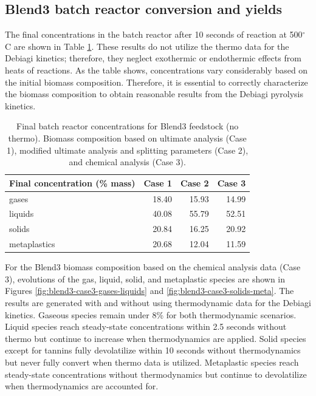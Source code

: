 \subsection{Blend3 batch reactor conversion and yields}

The final concentrations in the batch reactor after 10 seconds of reaction at 500$^{\circ}$C are shown in Table \ref{tab:blend3-batch-final}. These results do not utilize the thermo data for the Debiagi kinetics; therefore, they neglect exothermic or endothermic effects from heats of reactions. As the table shows, concentrations vary considerably based on the initial biomass composition. Therefore, it is essential to correctly characterize the biomass composition to obtain reasonable results from the Debiagi pyrolysis kinetics.

\begin{table}[H]
    \centering
    \caption{Final batch reactor concentrations for Blend3 feedstock (no thermo). Biomass composition based on ultimate analysis (Case 1), modified ultimate analysis and splitting parameters (Case 2), and chemical analysis (Case 3).}
    \label{tab:blend3-batch-final}
    \begin{tabular}{lrrr}
        \toprule
        Final concentration (\% mass) & Case 1 & Case 2 & Case 3 \\
        \midrule
        gases         & 18.40 & 15.93 & 14.99 \\
        liquids       & 40.08 & 55.79 & 52.51 \\
        solids        & 20.84 & 16.25 & 20.92 \\
        metaplastics  & 20.68 & 12.04 & 11.59 \\
        \bottomrule
    \end{tabular}
\end{table}

For the Blend3 biomass composition based on the chemical analysis data (Case 3), evolutions of the gas, liquid, solid, and metaplastic species are shown in Figures \ref{fig:blend3-case3-gases-liquids} and \ref{fig:blend3-case3-solids-meta}. The results are generated with and without using thermodynamic data for the Debiagi kinetics. Gaseous species remain under 8\% for both thermodynamic scenarios. Liquid species reach steady-state concentrations within 2.5 seconds without thermo but continue to increase when thermodynamics are applied. Solid species except for tannins fully devolatilize within 10 seconds without thermodynamics but never fully convert when thermo data is utilized. Metaplastic species reach steady-state concentrations without thermodynamics but continue to devolatilize when thermodynamics are accounted for.

